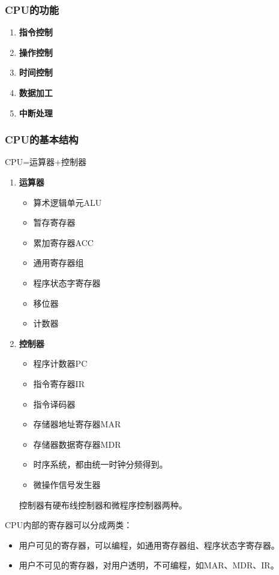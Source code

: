 \documentclass[12pt, a4paper, oneside]{ctexart}
\begin{document}
\subsubsection{CPU的功能}

\begin{enumerate}
  \item {\bf 指令控制}
  \item {\bf 操作控制}
  \item {\bf 时间控制}
  \item {\bf 数据加工}
  \item {\bf 中断处理}
\end{enumerate}

\subsubsection{CPU的基本结构}

CPU=运算器+控制器

\begin{enumerate}
  \item {\bf 运算器}
  \begin{itemize}
    \item 算术逻辑单元ALU
    \item 暂存寄存器
    \item 累加寄存器ACC
    \item 通用寄存器组
    \item 程序状态字寄存器
    \item 移位器
    \item 计数器
  \end{itemize}
  \item {\bf 控制器}
  \begin{itemize}
    \item 程序计数器PC
    \item 指令寄存器IR
    \item 指令译码器
    \item 存储器地址寄存器MAR
    \item 存储器数据寄存器MDR
    \item 时序系统，都由统一时钟分频得到。
    \item 微操作信号发生器
  \end{itemize}
  控制器有硬布线控制器和微程序控制器两种。
\end{enumerate}

CPU内部的寄存器可以分成两类：
\begin{itemize}
  \item 用户可见的寄存器，可以编程，如通用寄存器组、程序状态字寄存器。
  \item 用户不可见的寄存器，对用户透明，不可编程，如MAR、MDR、IR。
\end{itemize}
\end{document}
